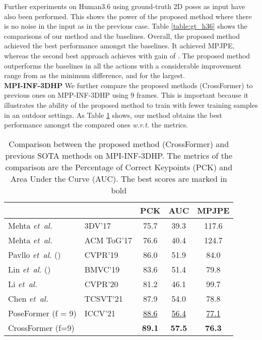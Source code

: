 \documentclass[runningheads]{llncs}
\newcommand{\latinphrase}[1]{\textit{#1}}
\newcommand{\etal}{\latinphrase{et~al.}\xspace}
\begin{document}
Further experiments on Human3.6 using ground-truth 2D poses as input have also been performed. This shows the power of the proposed method where there is no noise in the input as in the previous case. Table \ref{table:gt_h36} shows the comparisons of our method and the baselines. Overall, the proposed method achieved the best performance amongst the baselines. It achieved  MPJPE, whereas the second best approach achieves  with gain of . The proposed method outperforms the baselines in all the actions with a considerable improvement range from  as the minimum difference, and  for the largest.
\\
\textbf{MPI-INF-3DHP} 
We further compare the proposed methods (CrossFormer) to previous ones on MPP-INF-3DHP using 9 frames.  This is important because it illustrates the ability of the proposed method to train with fewer training samples in an outdoor settings. As Table \ref{tab:INF} shows, our method obtains the best performance amongst the compared ones \textit{w.r.t.} the metrics.
\begin{table}
\centering
\caption{Comparison between the proposed method (CrossFormer) and previous SOTA methods on MPI-INF-3DHP. The metrics of the comparison are the Percentage of Correct Keypoints (PCK) and Area Under the Curve (AUC). The best scores are marked in bold}
\begin{tabular}{l|l|ccc}
\hline 
 &  & PCK \textuparrow{}  & AUC \textuparrow{} & MPJPE \textdownarrow{}\tabularnewline
\hline 
 Mehta \etal \cite{mehta2017monocular}& 3DV\textquoteright 17  & 75.7  & 39.3  & 117.6\tabularnewline
 Mehta \etal \cite{mehta2017vnect}& ACM ToG\textquoteright 17  & 76.6  & 40.4  & 124.7\tabularnewline

Pavllo \etal \cite{pavllo20193d} () & CVPR\textquoteright 19  & 86.0  & 51.9  & 84.0\tabularnewline



Lin \etal \cite{lin2019trajectory} () & BMVC\textquoteright 19  & 83.6  & 51.4  & 79.8\tabularnewline

 Li \etal \cite{li2020cascaded}& CVPR\textquoteright 20  & 81.2  & 46.1 & 99.7\tabularnewline

 Chen \etal \cite{chen2021anatomy}& TCSVT\textquoteright 21  & 87.9  & 54.0  & 78.8\tabularnewline

 PoseFormer \cite{poseformer} (f = 9)& ICCV\textquoteright 21 & \underline{88.6}  & \underline{56.4} & \underline{77.1}\tabularnewline
\hline 
 CrossFormer (f=9)&  &  \textbf{89.1} & \textbf{57.5} & \textbf{76.3}\tabularnewline
 \hline
\end{tabular}
\label{tab:INF}
\end{table}
\end{document}
